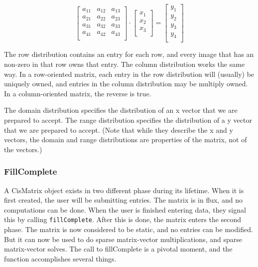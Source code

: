 \documentclass[10pt,relax]{TpetraDesign}
\begin{document}
\begin{equation}
\left[
\begin{array}{cccc}
a_{11} & a_{12} & a_{13}\\
a_{21} & a_{22} & a_{23}\\
a_{31} & a_{32} & a_{33}\\
a_{41} & a_{42} & a_{43}\\
\end{array}
\right]
\cdot
\left[
\begin{array}{c}
x_{1}\\
x_{2}\\
x_{3}\\
\end{array}
\right]
=
\left[
\begin{array}{c}
y_{1}\\
y_{2}\\
y_{3}\\
y_{4}\\
\end{array}
\right]
\end{equation}

The row distribution contains an entry for each row, and every image that has an non-zero in that row owns that entry. The column distribution works the same way. In a row-oriented matrix, each entry in the row distribution will (usually) be uniquely owned, and entries in the column distribution may be multiply owned. In a column-oriented matrix, the reverse is true. 

The domain distribution specifies the distribution of an x vector that we are prepared to accept. The range distribution specifies the distribution of a y vector that we are prepared to accept. (Note that while they describe the x and y vectors, the domain and range distributions are properties of the matrix, not of the vectors.)

\subsubsection*{FillComplete}
A CisMatrix object exists in two different phase during its lifetime. When it is first created, the user will be submitting entries. The matrix is in flux, and no computations can be done. When the user is finished entering data, they signal this by calling \texttt{fillComplete}. After this is done, the matrix enters the second phase. The matrix is now considered to be static, and no entries can be modified. But it can now be used to do sparse matrix-vector multiplications, and sparse matrix-vector solves. The call to fillComplete is a pivotal moment, and the function accomplishes several things.
\end{document}
